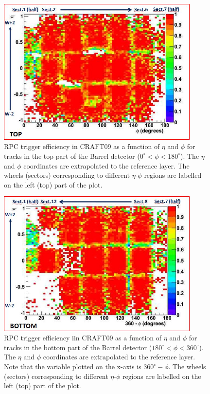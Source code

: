 \begin{figure}[hbtp]
  \begin{center} 
     \includegraphics[width=0.9\textwidth]{eff_eta_phi_top_09_new}
       \caption{RPC trigger efficiency in CRAFT09 as a function 
       of $\eta$ and $\phi$ for tracks in the top part of the Barrel detector
      ($ 0^\circ < \phi < 180^\circ $). The $\eta$ and $\phi$
      coordinates are extrapolated to the reference layer.
      The wheels (sectors) corresponding to different $\eta$-$\phi$
      regions are labelled on the left (top) part of the plot.
}
    \label{fig:eff_eta_phi_top_09}
  \end{center}
\end{figure}


\begin{figure}[hbtp]
     \begin{center}
      \includegraphics[width=0.9\textwidth]{eff_eta_phi_bot_09_new}
       \caption{RPC trigger efficiency iin CRAFT09 as a function of $\eta$ and $\phi$
       for tracks in the bottom part of the Barrel detector
       ($ 180^\circ < \phi < 360^\circ $). The $\eta$ and $\phi$ coordinates are
       extrapolated to the reference layer.
       Note that the variable plotted on the x-axis is
       $360^\circ - \phi$. The wheels (sectors) corresponding to different $\eta$-$\phi$
       regions are labelled on the left (top) part of the plot.
       }
    \label{fig:eff_eta_phi_bot_09}
  \end{center}
\end{figure}


